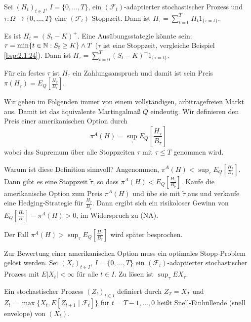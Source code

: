 \documentclass[a4paper,twoside,DIV15,BCOR12mm]{scrbook}
\newcommand{\cF}{\mathcal F}
\begin{document}
Sei $(H_t)_{t\in I}$, $I=\{0,\ldots,T\}$, ein $(\cF_t)$-adaptierter stochastischer Prozess und $\tau:\Omega \to\{0,\ldots,T\}$ eine $(\cF_t)$-Stoppzeit. Dann ist $H_\tau = \sum_{t=0}^T H_t 1_{\{\tau = t\}}$.

\begin{beispiel}
Es ist $H_t=(S_t-K)^+$. Eine Ausübungsstategie könnte sein: $\tau = \min\{t\in \mathbb{N}: S_t\ge K\} \wedge T$ ($\tau$ ist eine Stoppzeit, vergleiche Beispiel \ref{bsp:2.1.24}). Dann ist
$H_\tau = \sum_{t=0}^T (S_t-K)^+ 1_{\{\tau = t\}}$.

Für ein festes $\tau$ ist $H_\tau$ ein Zahlungsanspruch und damit ist sein Preis $\pi(H_\tau) = E_Q[\frac{H_\tau}{B_\tau}]$.
\end{beispiel}

\begin{bemerkung}
Wir gehen im Folgenden immer von einem vollständigen, arbitragefreien Markt aus. Damit ist das äquivalente Martingalmaß $Q$ eindeutig. Wir definieren den Preis einer amerikanischen Option durch 
\[
\pi^A(H) = \sup_{\tau}E_Q\left[\frac{H_\tau}{B_\tau}\right]
\]
wobei das Supremum über alle Stoppzeiten $\tau$ mit $\tau\le T$ genommen wird.

Warum ist diese Definition sinnvoll? Angenommen, $\pi^A(H) < \sup_{\tau}E_Q\left[\frac{H_\tau}{B_\tau}\right]$. Dann gibt es eine Stoppzeit $\tilde\tau$, so dass $\pi^A(H) < E_Q\left[ \frac{H_{\tilde\tau}}{B_{\tilde\tau}}\right]$. Kaufe die amerikanische Option zum Preis $\pi^A(H)$ und übe sie mit $\tilde\tau$ aus und verkaufe eine Hedging-Strategie für $\frac{H_{\tilde\tau}}{B_{\tilde\tau}}$. Dann ergibt sich ein risikoloser Gewinn von $E_Q\left[ \frac{H_{\tilde\tau}}{B_{\tilde\tau}}\right] -\pi^A(H) > 0$, im Widerspruch zu (NA).

Der Fall $\pi^A(H) > \sup_{\tau}E_Q\left[\frac{H_\tau}{B_\tau}\right]$ wird später besprochen.
\end{bemerkung}

Zur Bewertung einer amerikanischen Option muss ein optimales Stopp-Problem gelöst werden. Sei $(X_t)_{t\in I}$, $I=\{0,\ldots,T\}$ ein $(\cF_t)$-adaptierter stochastischer Prozess mit $E|X_t|<\infty$ für alle $t\in I$. Zu lösen ist $\sup_{\tau} EX_\tau$.

\begin{definition}
Ein stochastischer Prozess $(Z_t)_{t\in I}$ definiert durch
$Z_T = X_T$ und $Z_t = \max\{X_t, E[Z_{t+1}\mid \cF_t]\}$ für $t=T-1,\ldots,0$ heißt Snell-Einhüllende (snell envelope) von $(X_t)$.
\end{definition}
\end{document}
